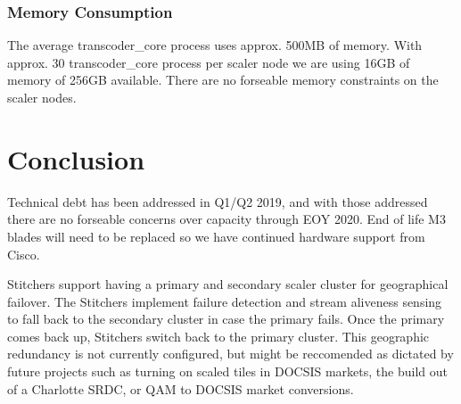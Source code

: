 \documentclass{article}
\begin{document}
\subsubsection{Memory Consumption}
\label{SECTION-Memory}

The average transcoder\_core process uses approx. 500MB of memory. With approx. 30 transcoder\_core process per scaler node we are using 16GB of memory of 256GB available. There are no forseable memory constraints on the scaler nodes. 



\section{Conclusion}
\label{SECTION-Conclusion}

Technical debt has been addressed in Q1/Q2 2019, and with those addressed there are no forseable concerns over capacity through EOY 2020. End of life M3 blades will need to be replaced so we have continued hardware support from Cisco. 

Stitchers support having a primary and secondary scaler cluster for geographical failover. The Stitchers implement failure detection and stream aliveness sensing to fall back to the secondary cluster in case the primary fails. Once the primary comes back up, Stitchers switch back to the primary cluster. This geographic redundancy is not currently configured, but might be reccomended as dictated by future projects such as turning on scaled tiles in DOCSIS markets, the build out of a Charlotte SRDC, or QAM to DOCSIS market conversions.
\end{document}

